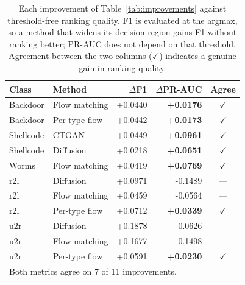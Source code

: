 \begin{table}[t]
\centering
\caption{Each improvement of Table~\ref{tab:improvements} against threshold-free ranking quality. F1 is evaluated at the argmax, so a method that widens its decision region gains F1 without ranking better; PR-AUC does not depend on that threshold. Agreement between the two columns ($\checkmark$) indicates a genuine gain in ranking quality.}
\label{tab:prauc}
\begin{tabular}{llrrc}
\toprule
Class & Method & $\Delta$F1 & $\Delta$PR-AUC & Agree \\
\midrule
Backdoor & Flow matching & +0.0440 & \textbf{+0.0176} & $\checkmark$ \\
Backdoor & Per-type flow & +0.0442 & \textbf{+0.0173} & $\checkmark$ \\
Shellcode & CTGAN & +0.0449 & \textbf{+0.0961} & $\checkmark$ \\
Shellcode & Diffusion & +0.0218 & \textbf{+0.0651} & $\checkmark$ \\
Worms & Flow matching & +0.0419 & \textbf{+0.0769} & $\checkmark$ \\
\midrule
r2l & Diffusion & +0.0971 & -0.1489 & --- \\
r2l & Flow matching & +0.0459 & -0.0564 & --- \\
r2l & Per-type flow & +0.0712 & \textbf{+0.0339} & $\checkmark$ \\
u2r & Diffusion & +0.1878 & -0.0626 & --- \\
u2r & Flow matching & +0.1677 & -0.1498 & --- \\
u2r & Per-type flow & +0.0591 & \textbf{+0.0230} & $\checkmark$ \\
\midrule
\multicolumn{5}{l}{Both metrics agree on 7 of 11 improvements.} \\
\bottomrule
\end{tabular}
\end{table}
